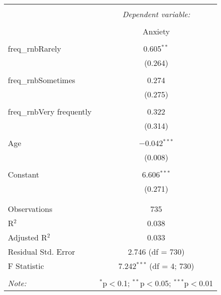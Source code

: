 \documentclass{article}
\begin{document}
\begin{table}[!htbp] \centering 
  \caption{} 
  \label{} 
\begin{tabular}{@{\extracolsep{5pt}}lc} 
\\[-1.8ex]\hline 
\hline \\[-1.8ex] 
 & \multicolumn{1}{c}{\textit{Dependent variable:}} \\ 
\cline{2-2} 
\\[-1.8ex] & Anxiety \\ 
\hline \\[-1.8ex] 
 freq\_rnbRarely & 0.605$^{**}$ \\ 
  & (0.264) \\ 
  & \\ 
 freq\_rnbSometimes & 0.274 \\ 
  & (0.275) \\ 
  & \\ 
 freq\_rnbVery frequently & 0.322 \\ 
  & (0.314) \\ 
  & \\ 
 Age & $-$0.042$^{***}$ \\ 
  & (0.008) \\ 
  & \\ 
 Constant & 6.606$^{***}$ \\ 
  & (0.271) \\ 
  & \\ 
\hline \\[-1.8ex] 
Observations & 735 \\ 
R$^{2}$ & 0.038 \\ 
Adjusted R$^{2}$ & 0.033 \\ 
Residual Std. Error & 2.746 (df = 730) \\ 
F Statistic & 7.242$^{***}$ (df = 4; 730) \\ 
\hline 
\hline \\[-1.8ex] 
\textit{Note:}  & \multicolumn{1}{r}{$^{*}$p$<$0.1; $^{**}$p$<$0.05; $^{***}$p$<$0.01} \\ 
\end{tabular} 
\end{table} 
\end{document}
